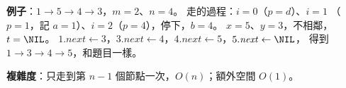 \begin{pastsoln}
\textbf{例子}：$1 \to 5 \to 4 \to 3$，$m = 2$、$n = 4$。 走的過程：$i = 0$（$p = d$）、$i = 1$
（$p = 1$，記 $a = 1$）、$i = 2$（$p = 4$），停下，$b = 4$。 $x = 5$、$y = 3$，不相鄰，$t = \NIL$。
$1.\mathit{next} \gets 3$，$3.\mathit{next} \gets 4$，$4.\mathit{next} \gets 5$，$5.\mathit{next} \gets \NIL$，
得到 $1 \to 3 \to 4 \to 5$，和題目一樣。

\textbf{複雜度}：只走到第 $n - 1$ 個節點一次，$O(n)$；額外空間 $O(1)$。
\end{pastsoln}
